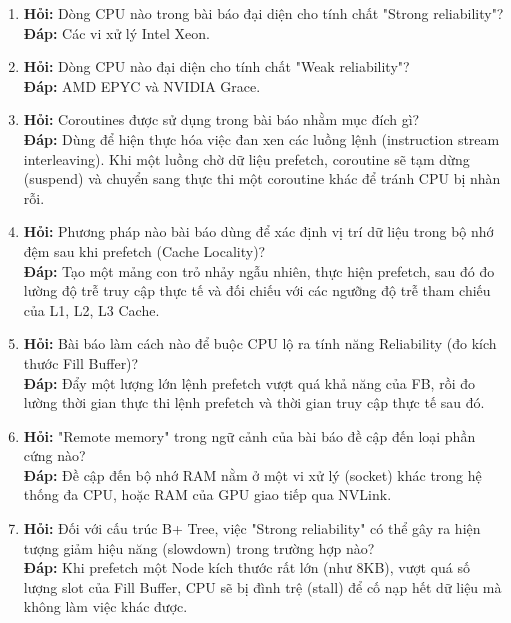 \documentclass[12pt,a4paper]{article}
\begin{document}
\begin{enumerate}
    \item \textbf{Hỏi:} Dòng CPU nào trong bài báo đại diện cho tính chất "Strong reliability"? \\
    \textbf{Đáp:} Các vi xử lý Intel Xeon.
    
    \item \textbf{Hỏi:} Dòng CPU nào đại diện cho tính chất "Weak reliability"? \\
    \textbf{Đáp:} AMD EPYC và NVIDIA Grace.
    
    \item \textbf{Hỏi:} Coroutines được sử dụng trong bài báo nhằm mục đích gì? \\
    \textbf{Đáp:} Dùng để hiện thực hóa việc đan xen các luồng lệnh (instruction stream interleaving). Khi một luồng chờ dữ liệu prefetch, coroutine sẽ tạm dừng (suspend) và chuyển sang thực thi một coroutine khác để tránh CPU bị nhàn rỗi.
    
    \item \textbf{Hỏi:} Phương pháp nào bài báo dùng để xác định vị trí dữ liệu trong bộ nhớ đệm sau khi prefetch (Cache Locality)? \\
    \textbf{Đáp:} Tạo một mảng con trỏ nhảy ngẫu nhiên, thực hiện prefetch, sau đó đo lường độ trễ truy cập thực tế và đối chiếu với các ngưỡng độ trễ tham chiếu của L1, L2, L3 Cache.
    
    \item \textbf{Hỏi:} Bài báo làm cách nào để buộc CPU lộ ra tính năng Reliability (đo kích thước Fill Buffer)? \\
    \textbf{Đáp:} Đẩy một lượng lớn lệnh prefetch vượt quá khả năng của FB, rồi đo lường thời gian thực thi lệnh prefetch và thời gian truy cập thực tế sau đó.
    
    \item \textbf{Hỏi:} "Remote memory" trong ngữ cảnh của bài báo đề cập đến loại phần cứng nào? \\
    \textbf{Đáp:} Đề cập đến bộ nhớ RAM nằm ở một vi xử lý (socket) khác trong hệ thống đa CPU, hoặc RAM của GPU giao tiếp qua NVLink.
    
    \item \textbf{Hỏi:} Đối với cấu trúc B+ Tree, việc "Strong reliability" có thể gây ra hiện tượng giảm hiệu năng (slowdown) trong trường hợp nào? \\
    \textbf{Đáp:} Khi prefetch một Node kích thước rất lớn (như 8KB), vượt quá số lượng slot của Fill Buffer, CPU sẽ bị đình trệ (stall) để cố nạp hết dữ liệu mà không làm việc khác được.
    

\end{enumerate}
\end{document}
